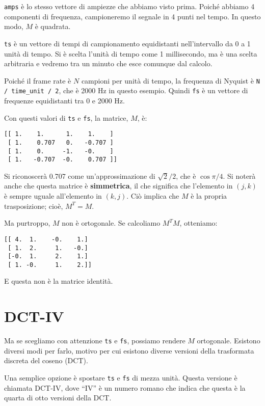 \documentclass[12pt,a4paper]{book}
\begin{document}
{\tt amps} è lo stesso vettore di ampiezze che abbiamo visto prima. Poiché abbiamo 4 componenti di frequenza, campioneremo il segnale in 4 punti nel tempo. In questo modo, $M$ è quadrata.

{\tt ts} è un vettore di tempi di campionamento equidistanti nell'intervallo da 0 a 1 unità di tempo. Si è scelta l'unità di tempo come 1 millisecondo, ma è una scelta arbitraria e vedremo tra un minuto che esce comunque dal calcolo.

Poiché il frame rate è $N$ campioni per unità di tempo, la frequenza di Nyquist è \verb"N / time_unit / 2", che è 2000 Hz in questo esempio. Quindi {\tt fs} è un vettore di frequenze equidistanti tra 0 e 2000 Hz.

Con questi valori di {\tt ts} e {\tt fs}, la matrice, $M$, è:

\begin{verbatim} 
[[ 1.    1.      1.    1.    ]
 [ 1.    0.707   0.   -0.707 ] 
 [ 1.    0.     -1.   -0.    ]
 [ 1.   -0.707  -0.    0.707 ]]
 \end{verbatim} 

Si riconoscerà 0.707 come un'approssimazione di $\sqrt{2}/2$, che è $\cos \pi/4$. Si noterà anche che questa matrice è {\bf simmetrica}, il che significa che l'elemento in $(j, k)$ è sempre uguale all'elemento in $(k, j)$. Ciò implica che $M$ è la propria trasposizione; cioè, $M^T = M$.

Ma purtroppo, $M$ non è ortogonale. Se calcoliamo $M^TM$, otteniamo:

\begin{verbatim} 
[[ 4.  1.    -0.    1.]
 [ 1.  2.     1.   -0.]
 [-0.  1.     2.    1.]
 [ 1. -0.     1.    2.]]
 \end{verbatim} 

E questa non è la matrice identità.

\section{DCT-IV} \label{dctiv} 

Ma se scegliamo con attenzione {\tt ts} e {\tt fs}, possiamo rendere $M$ ortogonale. Esistono diversi modi per farlo, motivo per cui esistono diverse versioni della trasformata discreta del coseno (DCT).

Una semplice opzione è spostare {\tt ts} e {\tt fs} di mezza unità. Questa versione è chiamata DCT-IV, dove ``IV'' è un numero romano che indica che questa è la quarta di otto versioni della DCT.
\end{document}
